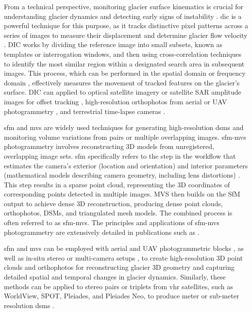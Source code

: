 From a technical perspective, monitoring glacier surface kinematics is crucial for understanding glacier dynamics and detecting early signs of instability \citep{Faillettaz2015}.
\ac{dic} is a powerful technique for this purpose, as it tracks distinctive pixel patterns across a series of images to measure their displacement and determine glacier flow velocity \cite{ahn_box_2010, Giordan2016, Hadhri2019}. 
DIC works by dividing the reference image into small subsets, known as templates or interrogation windows, and then using cross-correlation techniques to identify the most similar region within a designated search area in subsequent images. 
This process, which can be performed in the spatial domain \citep{Scambos1992} or frequency domain \citep{rolstad1997}, effectively measures the movement of tracked features on the glacier's surface.
DIC can applied to optical satellite imagery \cite{Scherler2008, Heid2012_evaluation_xcorr} or satellite SAR amplitude images for offset tracking \citep{schellenberger2015sar}, high-resolution orthophotos from aerial or UAV photogrammetry \cite{immerzeel2014, Chudley2019, Cao2021}, and terrestrial time-lapse cameras \cite{Dematteis2024, ioli2024deep}.

\Ac{sfm} \citep{Westoby2012} and \ac{mvs} \citep{Seitz2006} are widely used techniques for generating high-resolution \acp{dsm} and monitoring volume variations from pairs or multiple overlapping images. 
\ac{sfm}-\ac{mvs} photogrammetry involves reconstructing 3D models from unregistered, overlapping image sets.
\ac{sfm} specifically refers to the step in the workflow that estimates the camera's exterior (location and orientation) and interior parameters (mathematical models describing camera geometry, including lens distortions) \cite{brown1971}. 
This step results in a sparse point cloud, representing the 3D coordinates of corresponding points detected in multiple images.
MVS then builds on the SfM output to achieve dense 3D reconstruction, producing dense point clouds, orthophotos, DSMs, and triangulated mesh models. 
The combined process is often referred to as \ac{sfm}-\ac{mvs}.
The principles and applications of \ac{sfm}-\ac{mvs} photogrammetry are extensively detailed in publications such as \citet{Westoby2012, James2012, Eltner2016, Eltner2020}.

\Ac{sfm} and \ac{mvs} can be employed with aerial and UAV photogrammetric blocks \cite{Degaetani2021, ioli2021mid}, as well as in-situ stereo \cite{ioli2024deep} or multi-camera setups \cite{Taylor2023}, to create high-resolution 3D point clouds and orthophotos for reconstructing glacier 3D geometry and capturing detailed spatial and temporal changes in glacier dynamics.
Similarly, these methods can be applied to stereo pairs or triplets from \ac{vhr} satellites, such as WorldView, SPOT, Pleiades, and Pleiades Neo, to produce meter or sub-meter resolution \acp{dsm} \citep{rupnik2018_VHR, Perko218, Tonolo2020}.

